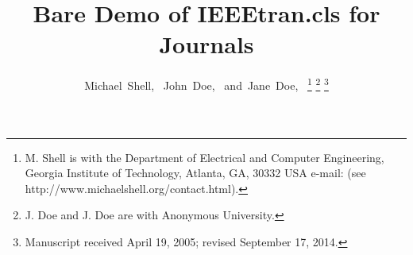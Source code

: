 \documentclass[journal]{IEEEtran}
\begin{document}
%
\title{Bare Demo of IEEEtran.cls for Journals}
%
%
%

\author{Michael~Shell,~
        John~Doe,~
        and~Jane~Doe,~%
\thanks{M. Shell is with the Department
of Electrical and Computer Engineering, Georgia Institute of Technology, Atlanta,
GA, 30332 USA e-mail: (see http://www.michaelshell.org/contact.html).}%
\thanks{J. Doe and J. Doe are with Anonymous University.}%
\thanks{Manuscript received April 19, 2005; revised September 17, 2014.}}

% 
%
\end{document}
